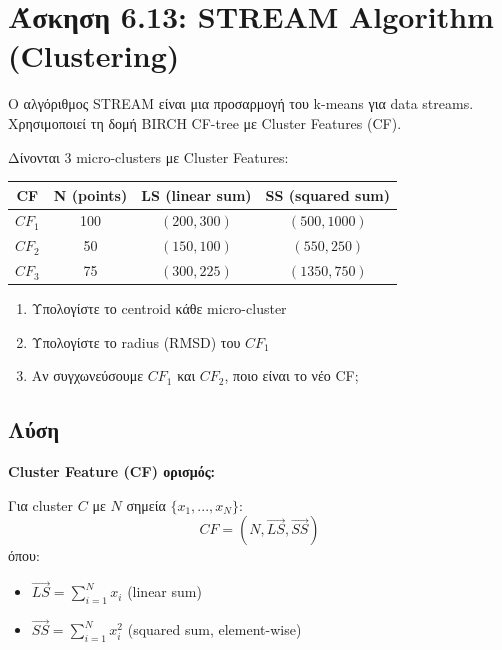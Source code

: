 \section{Άσκηση 6.13: STREAM Algorithm (Clustering)}

\begin{formulabox}[Εκφώνηση]
Ο αλγόριθμος STREAM είναι μια προσαρμογή του k-means για data streams.
Χρησιμοποιεί τη δομή BIRCH CF-tree με Cluster Features (CF).

Δίνονται 3 micro-clusters με Cluster Features:
\begin{center}
\begin{tabular}{cccc}
\toprule
\textbf{CF} & \textbf{N} (points) & \textbf{LS} (linear sum) & \textbf{SS} (squared sum) \\
\midrule
$CF_1$ & 100 & $(200, 300)$ & $(500, 1000)$ \\
$CF_2$ & 50 & $(150, 100)$ & $(550, 250)$ \\
$CF_3$ & 75 & $(300, 225)$ & $(1350, 750)$ \\
\bottomrule
\end{tabular}
\end{center}

\begin{enumerate}
    \item Υπολογίστε το centroid κάθε micro-cluster
    \item Υπολογίστε το radius (RMSD) του $CF_1$
    \item Αν συγχωνεύσουμε $CF_1$ και $CF_2$, ποιο είναι το νέο CF;
\end{enumerate}
\end{formulabox}

\subsection*{Λύση}

\textbf{Cluster Feature (CF) ορισμός:}

Για cluster $C$ με $N$ σημεία $\{x_1, ..., x_N\}$:
$$CF = (N, \vec{LS}, \vec{SS})$$
όπου:
\begin{itemize}
    \item $\vec{LS} = \sum_{i=1}^{N} x_i$ (linear sum)
    \item $\vec{SS} = \sum_{i=1}^{N} x_i^2$ (squared sum, element-wise)
\end{itemize}


